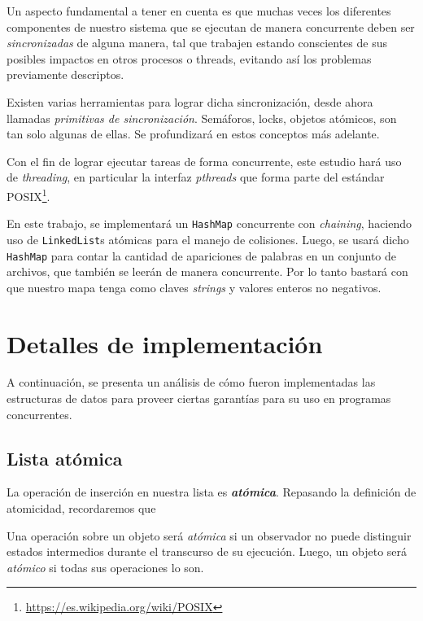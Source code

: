 \documentclass[a4paper]{article}
\begin{document}
Un aspecto fundamental a tener en cuenta es que muchas veces los diferentes componentes de nuestro sistema que se ejecutan de manera concurrente deben ser \textit{sincronizadas} de alguna manera, tal que trabajen estando conscientes de sus posibles impactos en otros procesos o threads, evitando así los problemas previamente descriptos. 

Existen varias herramientas para lograr dicha sincronización, desde ahora llamadas \textit{primitivas de sincronización}. Semáforos, locks, objetos atómicos, son tan solo algunas de ellas. Se profundizará en estos conceptos más adelante.

Con el fin de lograr ejecutar tareas de forma concurrente, este estudio hará uso de \textit{threading}, en particular la interfaz \textit{pthreads} que forma parte del estándar POSIX\footnote{\href{https://es.wikipedia.org/wiki/POSIX}{https://es.wikipedia.org/wiki/POSIX}}.

En este trabajo, se implementará un \texttt{HashMap} concurrente con \textit{chaining}, haciendo uso de \texttt{LinkedList}s atómicas para el manejo de colisiones. Luego, se usará dicho \texttt{HashMap} para contar la cantidad de apariciones de palabras en un conjunto de archivos, que también se leerán de manera concurrente. Por lo tanto bastará con que nuestro mapa tenga como claves \textit{strings} y valores enteros no negativos.

\section{Detalles de implementación}

A continuación, se presenta un análisis de cómo fueron implementadas las estructuras de datos para proveer ciertas garantías para su uso en programas concurrentes.

\subsection{Lista atómica}

La operación de inserción en nuestra lista es \textbf{\textit{atómica}}. Repasando la definición de atomicidad, recordaremos que

\begin{displayquote}
    Una operación sobre un objeto será \textit{atómica} si un observador no puede distinguir estados intermedios durante el transcurso de su ejecución. Luego, un objeto será \textit{atómico} si todas sus operaciones lo son.
\end{displayquote}
\end{document}
